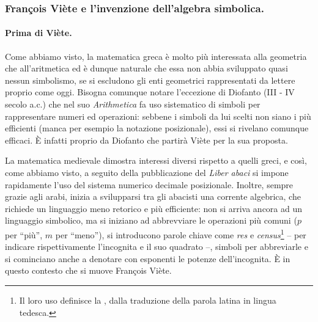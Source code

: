 \subsubsection{Fran\c{c}ois Vi\`ete e l'invenzione dell'algebra simbolica.}\label{FrancoisVieteELInvenzioneDellAlgebraSimbolica}
\paragraph{Prima di Vi\`ete.} Come abbiamo visto, la matematica greca \`e molto pi\`u interessata alla geometria che all'aritmetica ed \`e dunque naturale che essa non abbia sviluppato quasi nessun simbolismo, se si escludono gli enti geometrici rappresentati da lettere proprio come oggi. Bisogna comunque notare l'eccezione di Diofanto (III - IV secolo a.c.) che nel suo \textit{Arithmetica} fa uso sistematico di simboli per rappresentare numeri ed operazioni: sebbene i simboli da lui scelti non siano i pi\`u efficienti (manca per esempio la notazione posizionale), essi si rivelano comunque efficaci. \`E infatti proprio da Diofanto che partir\`a Vi\`ete per la sua proposta.
\par La matematica medievale dimostra interessi diversi rispetto a quelli greci, e cos\`i, come abbiamo visto, a seguito della pubblicazione del \textit{Liber abaci} si impone rapidamente l'uso del sistema numerico decimale posizionale. Inoltre, sempre grazie agli arabi, inizia a svilupparsi tra gli abacisti una corrente algebrica, che richiede un linguaggio meno retorico e pi\`u efficiente: non si arriva ancora ad un linguaggio simbolico, ma si iniziano ad abbrevviare le operazioni pi\`u comuni ($p$ per ``pi\`u'', $m$ per ``meno''), si introducono parole chiave come \textit{res} e \textit{census}\footnote{Il loro uso definisce la , dalla traduzione della parola latina  in lingua tedesca.} -- per indicare rispettivamente l'incognita e il suo quadrato --, simboli per abbreviarle e si cominciano anche a denotare con esponenti le potenze dell'incognita. \`E in questo contesto che si muove Fran\c{c}ois Vi\`ete.
